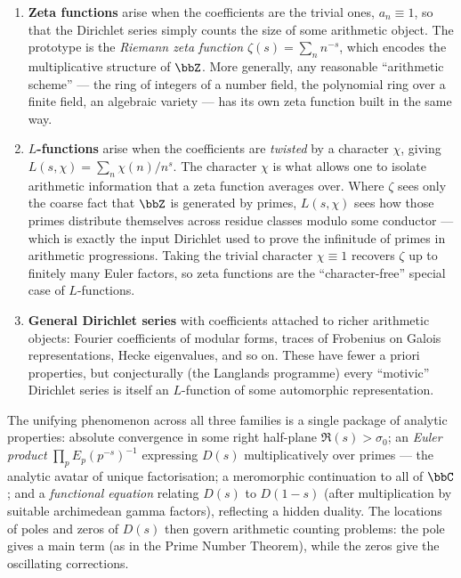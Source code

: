\begin{enumerate}
  \item\textbf{Zeta functions} arise when the coefficients are the trivial ones, $a_n\equiv 1$, so that the Dirichlet series simply counts the size of some arithmetic object. The prototype is the \emph{Riemann zeta function} $\zeta(s)=\sum_n n^{-s}$, which encodes the multiplicative structure of $\bbZ$. More generally, any reasonable ``arithmetic scheme'' --- the ring of integers of a number field, the polynomial ring over a finite field, an algebraic variety --- has its own zeta function built in the same way.

  \item\textbf{$L$-functions} arise when the coefficients are \emph{twisted} by a character $\chi$, giving $L(s,\chi)=\sum_n \chi(n)/n^s$. The character $\chi$ is what allows one to isolate arithmetic information that a zeta function averages over. Where $\zeta$ sees only the coarse fact that $\bbZ$ is generated by primes, $L(s,\chi)$ sees how those primes distribute themselves across residue classes modulo some conductor --- which is exactly the input Dirichlet used to prove the infinitude of primes in arithmetic progressions. Taking the trivial character $\chi\equiv 1$ recovers $\zeta$ up to finitely many Euler factors, so zeta functions are the ``character-free'' special case of $L$-functions.

  \item\textbf{General Dirichlet series} with coefficients attached to richer arithmetic objects: Fourier coefficients of modular forms, traces of Frobenius on Galois representations, Hecke eigenvalues, and so on. These have fewer a priori properties, but conjecturally (the Langlands programme) every ``motivic'' Dirichlet series is itself an $L$-function of some automorphic representation.
\end{enumerate}

The unifying phenomenon across all three families is a single package of analytic properties: absolute convergence in some right half-plane $\Re(s)>\sigma_0$; an \emph{Euler product} $\prod_p E_p(p^{-s})^{-1}$ expressing $D(s)$ multiplicatively over primes --- the analytic avatar of unique factorisation; a meromorphic continuation to all of $\bbC$; and a \emph{functional equation} relating $D(s)$ to $D(1-s)$ (after multiplication by suitable archimedean gamma factors), reflecting a hidden duality. The locations of poles and zeros of $D(s)$ then govern arithmetic counting problems: the pole gives a main term (as in the Prime Number Theorem), while the zeros give the oscillating corrections.

